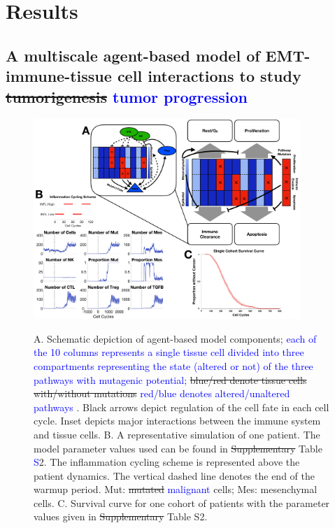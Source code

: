 \documentclass[11pt]{article}
\newcommand{\tcb} { \textcolor{blue} }
\begin{document}

\section{Results}

\subsection{A multiscale agent-based model of EMT-immune-tissue cell interactions to study \sout{tumorigenesis} \tcb{tumor progression}}\label{ExplModel}

\begin{figure}
\center
{\includegraphics[width=0.9\textwidth]{Figure1/Figure1.pdf}}
\caption{A. Schematic depiction of agent-based model components; \tcb{
each of the 10 columns represents a single tissue cell divided into three compartments representing the state (altered or not) of the three pathways with mutagenic potential;
}\sout{blue/red denote tissue cells with/without mutations} \tcb{red/blue denotes altered/unaltered pathways} . Black arrows depict regulation of the cell fate in each cell cycle. Inset depicts major interactions between the immune system and tissue cells.
B. A representative simulation of one patient. The model parameter values used can be found in \sout{Supplementary} Table \tcb{S}2. 
The inflammation cycling scheme is represented above the patient dynamics. The vertical dashed line denotes the end of the warmup period. Mut: \sout{mutated} \tcb{malignant} cells; Mes: mesenchymal cells. 
C. Survival curve for one cohort of patients with the parameter values given in \sout{Supplementary} Table {S}2. }
\label{fig:ModelIntro}
\end{figure}
\end{document}
